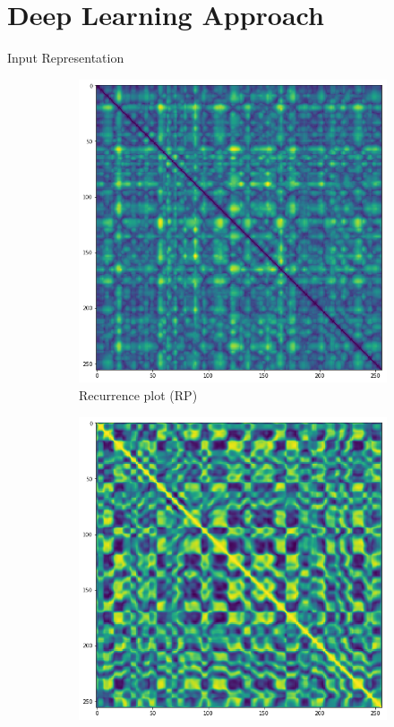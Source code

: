 \documentclass{beamer}
\begin{document}

\section{Deep Learning Approach}


\begin{frame}{Input Representation}
\begin{figure}[t]
\centering
\begin{subfigure}[t]{.5\textwidth}
  \centering
  \includegraphics[width=.9\linewidth]{./Images/chebyshev.png}
  \caption{Recurrence plot (RP)}
\end{subfigure}%
\begin{subfigure}[t]{.5\textwidth}
  \centering
  \includegraphics[width=.9\linewidth]{./Images/cs.png}

\end{subfigure}
\end{figure}
\end{frame}
\end{document}
